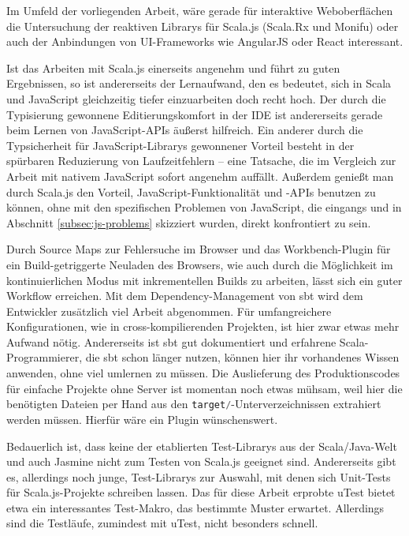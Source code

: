 \documentclass[a4paper, 12pt, hidelinks, listof=totoc, listoftables=totoc, bibliography=totoc]{scrreprt}
\newcommand{\code}[1]{\lstinline[language=Scala, style=inline]|#1|}
\begin{document}
Im Umfeld der vorliegenden Arbeit, wäre gerade für interaktive Weboberflächen die Untersuchung der reaktiven Librarys für Scala.js (Scala.Rx und Monifu) oder auch der Anbindungen von UI-Frameworks wie AngularJS oder React interessant.

Ist das Arbeiten mit Scala.js einerseits angenehm und führt zu guten Ergebnissen, so ist andererseits der Lernaufwand, den es bedeutet, sich in Scala und JavaScript gleichzeitig tiefer einzuarbeiten doch recht hoch. Der durch die Typisierung gewonnene Editierungskomfort in der \ac{IDE} ist andererseits gerade beim Lernen von JavaScript-\ac{API}s äußerst hilfreich. Ein anderer durch die Typsicherheit für JavaScript-Librarys gewonnener Vorteil besteht in der spürbaren Reduzierung von Laufzeitfehlern -- eine Tatsache, die im Vergleich zur Arbeit mit nativem JavaScript sofort angenehm auffällt. Außerdem genießt man durch Scala.js den Vorteil, JavaScript-Funktionalität und -\ac{API}s benutzen zu können, ohne mit den spezifischen Problemen von JavaScript, die eingangs und in Abschnitt \ref{subsec:js-problems} skizziert wurden, direkt konfrontiert zu sein.

Durch Source Maps zur Fehlersuche im Browser und das Workbench-Plugin für ein Build-getriggerte Neuladen des Browsers, wie auch durch die Möglichkeit im kontinuierlichen Modus mit inkrementellen Builds zu arbeiten, lässt sich ein guter Workflow erreichen. Mit dem Dependency-Management von sbt wird dem Entwickler zusätzlich viel Arbeit abgenommen. Für umfangreichere Konfigurationen, wie in cross-kompilierenden Projekten, ist hier zwar etwas mehr Aufwand nötig. Andererseits ist sbt gut dokumentiert und erfahrene Scala-Programmierer, die sbt schon länger nutzen, können hier ihr vorhandenes Wissen anwenden, ohne viel umlernen zu müssen. Die Auslieferung des Produktionscodes für einfache Projekte ohne Server ist momentan noch etwas mühsam, weil hier die benötigten Dateien per Hand aus den \code{target/}-Unterverzeichnissen extrahiert werden müssen. Hierfür wäre ein Plugin wünschenswert.

Bedauerlich ist, dass keine der etablierten Test-Librarys aus der Scala/Java-Welt und auch Jasmine nicht zum Testen von Scala.js geeignet sind. Andererseits gibt es, allerdings noch junge, Test-Librarys zur Auswahl, mit denen sich Unit-Tests für Scala.js-Projekte schreiben lassen. Das für diese Arbeit erprobte uTest bietet etwa ein interessantes Test-Makro, das bestimmte Muster erwartet. Allerdings sind die Testläufe, zumindest mit uTest, nicht besonders schnell.
\end{document}
